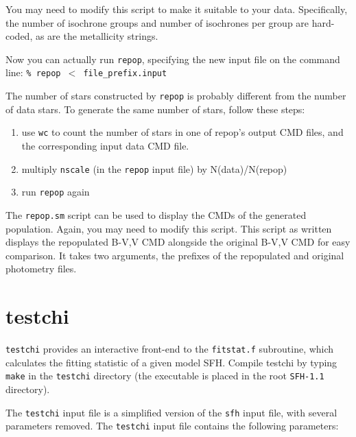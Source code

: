\documentclass[12pt]{book}
\def\ttg{\tt\color{DarkGreen}}
\def\tto{\tt\color{myOrange}}
\begin{document}
\medskip
You may need to modify this script to make it suitable to your data.
Specifically, the number of isochrone groups and number of isochrones 
per group are hard-coded, as are the metallicity strings.

Now you can actually run {\ttg repop}, specifying the new input file 
on the command line:
\medskip
\noindent
{\ttg \% repop $<$ file\_prefix.input}

\medskip
The number of stars constructed by {\ttg repop} is probably different 
from the number of data stars.  To generate the same number of stars, 
follow these steps:

\begin{enumerate}
\item use {\ttg wc} to count the number of stars in one of repop's 
output CMD files, and the corresponding input data CMD file.
 
\item multiply {\tto nscale} (in the {\ttg repop} input file) by 
N(data)/N(repop)

\item run {\ttg repop} again
\end{enumerate}

The {\ttg repop.sm} script can be used to display the CMDs of the 
generated population.  Again, you may need to modify this script.  
This script as written displays the repopulated B-V,V CMD alongside 
the original B-V,V CMD for easy comparison. It takes two arguments, 
the prefixes of the repopulated and original photometry files.


\chapter{testchi}\label{ch:testchi}

{\ttg testchi} provides an interactive front-end to the 
{\ttg fitstat.f} subroutine, which calculates the fitting statistic of 
a given model SFH.  Compile testchi by typing {\ttg make} in the 
{\ttg testchi} directory (the executable is placed in the root 
{\ttg SFH-1.1} directory).

The {\ttg testchi} input file is a simplified version of the 
{\ttg sfh} input file, with several parameters removed.  The 
{\ttg testchi} input file contains the following parameters:
 
\end{document}
